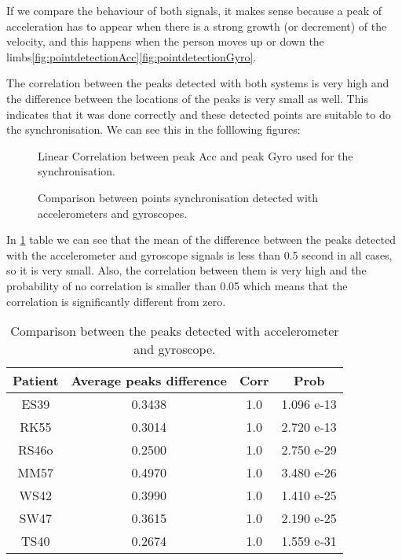 If we compare the behaviour of both signals, it makes sense because a peak of acceleration has to appear when there is a strong growth (or decrement) of the velocity, and this happens when the person moves up or down the limbs\ref{fig:pointdetectionAcc}\ref{fig:pointdetectionGyro}.

The correlation between the peaks detected with both systems is very high and the difference between the locations of the peaks is very small as well. This indicates that it was done correctly and these detected points are suitable to do the synchronisation. We can see this in the folllowing figures:

\begin{figure}[H]
	\centering
	\caption{Linear Correlation between peak Acc and peak Gyro used for the synchronisation.}
	\label{fig:corrAccGyroPoints}
\end{figure}

\begin{figure}[H]
	\centering
	\caption{Comparison between points synchronisation detected with accelerometers and gyroscopes.}
	\label{fig:barDiagram}
\end{figure}


In \ref{tab:comparationAccGyro} table we can see that the mean of the difference between the peaks detected with the accelerometer and gyroscope signals is less than 0.5 second in all cases, so it is very small. Also, the correlation between them is very high and the probability of no correlation is smaller than 0.05 which means that the correlation is significantly different from zero.

\begin{table}[h]
	\caption{Comparison between the peaks detected with accelerometer and gyroscope.}	
	\centering
	\begin{tabular}{|c|c|c|c|}\hline
		
		Patient 				& Average peaks difference 	& Corr 	& Prob 	\\ \hline
		ES39 & 0.3438			& 1.0									& 1.096 e-13					\\
		RK55	& 0.3014			& 1.0									& 2.720 e-13				\\
		RS46o & 0.2500			& 1.0									& 2.750  e-29					\\
		MM57	& 0.4970			& 1.0									& 3.480 e-26					\\
		WS42  & 0.3990			& 1.0									& 1.410 e-25					\\
		SW47	& 0.3615			& 1.0									& 2.190 e-25					\\
		TS40  & 0.2674			& 1.0									& 1.559 e-31				\\ \hline
	\end{tabular}
	\label{tab:comparationAccGyro}
	
\end{table}

